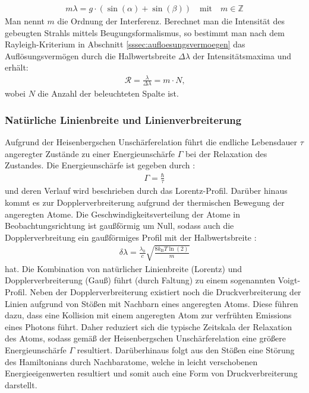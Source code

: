 \documentclass[11pt, a4paper]{article}
\numberwithin{equation}{section}
\begin{document}
\begin{align*}
	m \lambda = g \cdot \left( \sin(\alpha) + \sin(\beta) \right) \quad \text{mit} \quad m \in \mathbb{Z}
\end{align*}
Man nennt $m$ die Ordnung der Interferenz.
Berechnet man die Intensität des gebeugten Strahls mittels Beugungsformalismus, so bestimmt man nach dem Rayleigh-Kriterium in Abschnitt \ref{sssec:aufloesungsvermoegen} das Auflösungsvermögen durch die Halbwertsbreite $\Delta \lambda$ der Intensitätsmaxima und erhält:
\begin{align*}
	\mathcal{R} = \frac{\lambda}{\Delta \lambda} = m \cdot N \text{,}
\end{align*}
wobei $N$ die Anzahl der beleuchteten Spalte ist.

\subsubsection{Natürliche Linienbreite und Linienverbreiterung}
Aufgrund der Heisenbergschen Unschärferelation führt die endliche Lebensdauer $\tau$ angeregter Zustände zu einer Energieunschärfe $\Gamma$ bei der Relaxation des Zustandes.
Die Energieunschärfe ist gegeben durch \cite{demtroder}:
\begin{align*}
\Gamma = \frac{\hbar}{\tau}
\end{align*}
und deren Verlauf wird beschrieben durch das Lorentz-Profil.
Darüber hinaus kommt es zur Dopplerverbreiterung aufgrund der thermischen Bewegung der angeregten Atome.
Die Geschwindigkeitsverteilung der Atome in Beobachtungsrichtung ist gaußförmig um Null, sodass auch die Dopplerverbreitung ein gaußförmiges Profil mit der Halbwertsbreite \cite{demtroder}:
\begin{align}
\delta \lambda = \frac{\lambda_0}{c} \sqrt{\frac{8 k_\mathrm{B} T \ln(2)}{m}}
\label{eq:doppler}
\end{align}
hat.
Die Kombination von natürlicher Linienbreite (Lorentz) und Dopplerverbreiterung (Gauß) führt (durch Faltung) zu einem sogenannten Voigt-Profil.
Neben der Dopplerverbreiterung existiert noch die Druckverbreiterung der Linien aufgrund von Stößen mit Nachbarn eines angeregten Atoms.
Diese führen dazu, dass eine Kollision mit einem angeregten Atom zur verfrühten Emissions eines Photons führt.
Daher reduziert sich die typische Zeitskala der Relaxation des Atoms, sodass gemäß der Heisenbergschen Unschärferelation eine größere Energieunschärfe $\Gamma$ resultiert.
Darüberhinaus folgt aus den Stößen eine Störung des Hamiltonians durch Nachbaratome, welche in leicht verschobenen Energieeigenwerten resultiert und somit auch eine Form von Druckverbreiterung darstellt.
\end{document}
